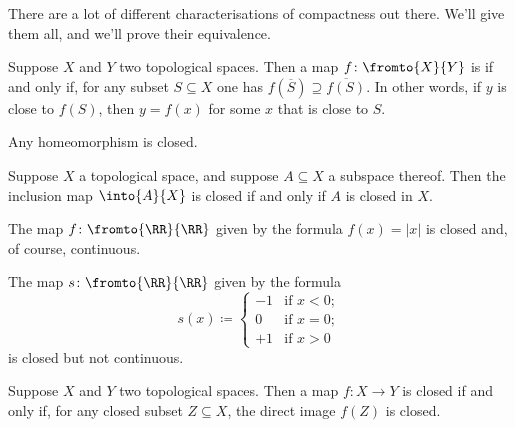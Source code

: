 
There are a lot of different characterisations of compactness out there.
We'll give them all,%
and we'll prove their equivalence.%

\begin{dfn}
	Suppose $X$ and $Y$ two topological spaces.
	Then a map $f\colon\fromto{X}{Y}$ is  if and only if, for any subset $S\subseteq X$ one has $f(\overline{S})\supseteq\overline{f(S)}$.
	In other words, if $y$ is close to $f(S)$, then $y=f(x)$ for some $x$ that is close to $S$.
\end{dfn}

\begin{exm}
	Any homeomorphism is closed.
\end{exm}

\begin{exm}
	Suppose $X$ a topological space, and suppose $A\subseteq X$ a subspace thereof.
	Then the inclusion map $\into{A}{X}$ is closed if and only if $A$ is closed in $X$.
\end{exm}

\begin{exm} The map $f\colon\fromto{\RR}{\RR}$ given by the formula $f(x)=|x|$ is closed and, of course, continuous.
\end{exm}

\begin{exm}
	The map $s\colon\fromto{\RR}{\RR}$ given by the formula
	\[
		s(x)\coloneq\begin{cases} -1&\text{if }x<0;\\
			0&\text{if }x=0;\\
			+1&\text{if }x>0
		\end{cases}
	\]
	is closed but not continuous.
\end{exm}

\begin{prp}
	Suppose $X$ and $Y$ two topological spaces.
	Then a map $f\colon X \to Y$ is closed if and only if, for any closed subset $Z\subseteq X$, the direct image $f(Z)$ is closed.
\end{prp}

